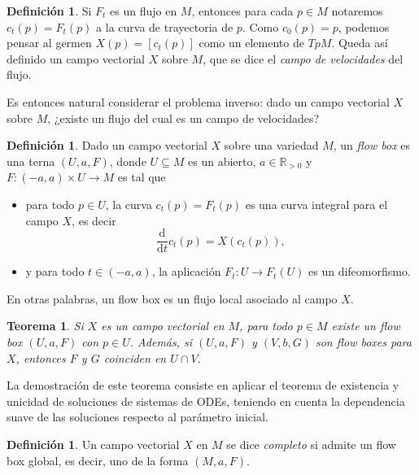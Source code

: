 \documentclass[11pt, a4paper]{article}
\newcommand{\RR}{\mathbb{R}}
\theoremstyle{plain}
\newtheorem{thm}[prop]{Teorema}
\theoremstyle{definition}
\newtheorem{defn}[prop]{Definición}
\begin{document}
\begin{defn} Si $F_t$ es un flujo en $M$, entonces para cada $p\in M$ notaremos $c_t(p)=F_t(p)$ a la curva de trayectoria de $p$. Como $c_0(p)=p$, podemos pensar al germen $X(p)=[c_t(p)]$ como un elemento de $TpM$. Queda así definido un campo vectorial $X$ sobre $M$, que se dice el \emph{campo de velocidades} del flujo.
\end{defn}

Es entonces natural considerar el problema inverso: dado un campo vectorial $X$ sobre $M$, ¿existe un flujo del cual es un campo de velocidades?

\begin{defn} Dado un campo vectorial $X$ sobre una variedad $M$, un \emph{flow box} es una terna $(U,a,F)$, donde $U\subseteq M$ es un abierto, $a\in\RR_{>0}$ y $F:(-a,a)\times U\to M$ es tal que
\begin{itemize}
\item para todo $p\in U$, la curva $c_t(p) = F_t(p)$ es una curva integral para el campo $X$, es decir
\[\frac{\mathrm{d}}{\mathrm{d}t}c_t(p) = X(c_t(p)),\]
\item y para todo $t\in (-a,a)$, la aplicación $F_t:U\to F_t(U)$ es un difeomorfismo.
\end{itemize}
En otras palabras, un flow box es un flujo local asociado al campo $X$.
\end{defn}
\begin{thm} Si $X$ es un campo vectorial en $M$, para todo $p\in M$ existe un flow box $(U,a,F)$ con $p\in U$. Además, si $(U,a,F)$ y $(V,b,G)$ son flow boxes para $X$, entonces $F$ y $G$ coinciden en $U\cap V$.\hfill\qedsymbol
\end{thm}

La demostración de este teorema consiste en aplicar el teorema de existencia y unicidad de soluciones de sistemas de ODEs, teniendo en cuenta la dependencia suave de las soluciones respecto al parámetro inicial.

\begin{defn} Un campo vectorial $X$ en $M$ se dice \emph{completo} si admite un flow box global, es decir, uno de la forma $(M,a,F)$.
\end{defn}
\end{document}
